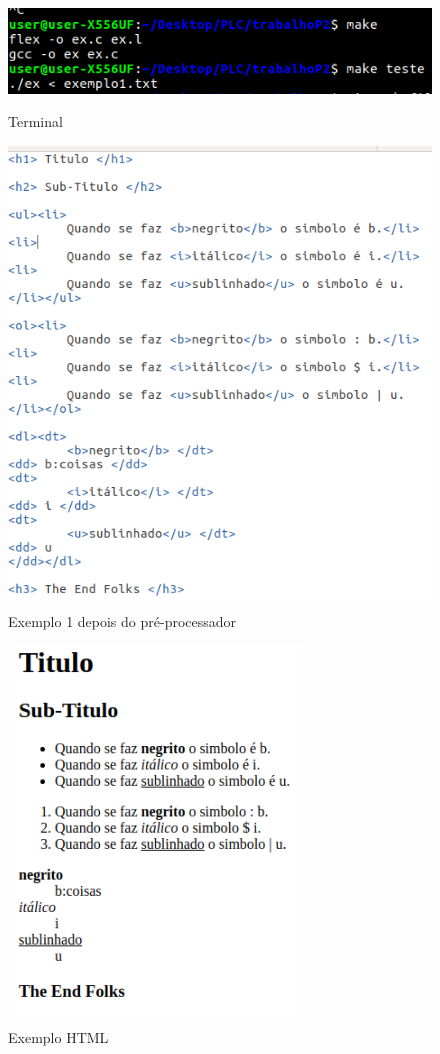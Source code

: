 \documentclass{report}
\begin{document}
\begin{figure}[h]
\centering
\includegraphics[width=15cm,height= 3cm]{terminal.png}
\caption{Terminal}
\label{Terminal}
\end{figure}
\begin{figure}[h]
\centering
\includegraphics[scale= 0.5]{exemplo1html.png}
\caption{Exemplo 1 depois do pré-processador}
\label{Ficheiro em HTML}
\end{figure}
\begin{figure}[h]
\centering
\includegraphics[width=8cm,height= 10cm]{HTML.png}
\caption{Exemplo HTML}
\label{HTML}
\end{figure}
\end{document}
